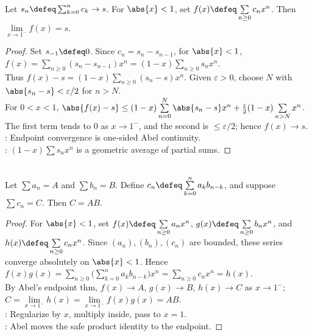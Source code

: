 \begin{theorem} \label{thm:abel-endpoint-theorem} \\
Let $s_n\defeq\sum_{k=0}^{n}c_k\to s$. For $\abs{x}<1$, set $f(x)\defeq\sum\limits_{n\geq0}c_nx^n$. Then $\lim\limits_{x\to1^-}f(x)=s$.
\begin{proof} Set $s_{-1}\defeq0$. Since $c_n=s_n-s_{n-1}$, for $\abs{x}<1$, $f(x)=\sum\limits_{n\geq0}(s_n-s_{n-1})x^n=(1-x)\sum\limits_{n\geq0}s_nx^n$.\\
Thus $f(x)-s=(1-x)\sum\limits_{n\geq0}(s_n-s)x^n$. Given $\varepsilon>0$, choose $N$ with $\abs{s_n-s}<\varepsilon/2$ for $n>N$.\\
For $0<x<1$, $\abs{f(x)-s}\leq(1-x)\sum\limits_{n=0}^{N}\abs{s_n-s}x^n+\frac{\varepsilon}{2}(1-x)\sum\limits_{n>N}x^n$.\\
The first term tends to $0$ as $x\to1^-$, and the second is $\leq\varepsilon/2$; hence $f(x)\to s$.\\
: Endpoint convergence is one-sided Abel continuity.\\
: $(1-x)\sum s_nx^n$ is a geometric average of partial sums.
\end{proof}
\end{theorem}

\begin{theorem} \label{thm:abel-product-theorem} \\
Let $\sum a_n=A$ and $\sum b_n=B$. Define $c_n\defeq\sum\limits_{k=0}^{n}a_kb_{n-k}$, and suppose $\sum c_n=C$. Then $C=AB$.
\begin{proof}
For $\abs{x}<1$, set $f(x)\defeq\sum\limits_{n\geq0}a_nx^n$, $g(x)\defeq\sum\limits_{n\geq0}b_nx^n$, and $h(x)\defeq\sum\limits_{n\geq0}c_nx^n$. Since $(a_n),(b_n),(c_n)$ are bounded, these series converge absolutely on $\abs{x}<1$. Hence $f(x)g(x)=\sum\limits_{n\geq0}\bigl(\sum\limits_{k=0}^{n}a_kb_{n-k}\bigr)x^n=\sum\limits_{n\geq0}c_nx^n=h(x)$.\\
By Abel's endpoint thm, $f(x)\to A$, $g(x)\to B$, $h(x)\to C$ as $x\to1^-$;$C=\lim\limits_{x\to1^-}h(x)=\lim\limits_{x\to1^-}f(x)g(x)=AB$.\\
: Regularize by $x$, multiply inside, pass to $x=1$.\\
: Abel moves the safe product identity to the endpoint.
\end{proof}
\end{theorem}


